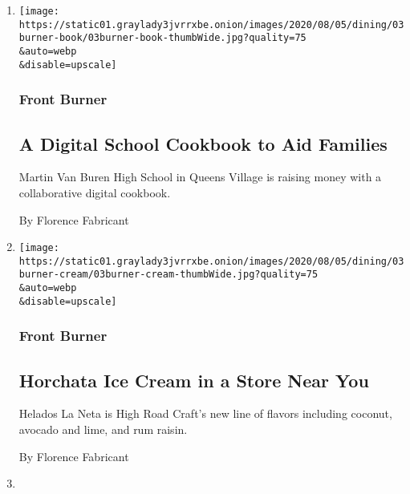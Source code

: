 \begin{enumerate}
\def\labelenumi{\arabic{enumi}.}
\item
  \href{/2020/08/03/dining/martin-van-buren-high-school-cookbook.html}{}

  \texttt{[image: https://static01.graylady3jvrrxbe.onion/images/2020/08/05/dining/03burner-book/03burner-book-thumbWide.jpg?quality=75\\\&auto=webp\\\&disable=upscale]}

  \hypertarget{front-burner-1}{%
  \subsubsection{Front Burner}\label{front-burner-1}}

  \hypertarget{a-digital-school-cookbook-to-aid-families}{%
  \subsection{A Digital School Cookbook to Aid
  Families}\label{a-digital-school-cookbook-to-aid-families}}

  Martin Van Buren High School in Queens Village is raising money with a
  collaborative digital cookbook.

  By Florence Fabricant
\item
  \href{/2020/08/03/dining/mexican-ice-cream.html}{}

  \texttt{[image: https://static01.graylady3jvrrxbe.onion/images/2020/08/05/dining/03burner-cream/03burner-cream-thumbWide.jpg?quality=75\\\&auto=webp\\\&disable=upscale]}

  \hypertarget{front-burner-2}{%
  \subsubsection{Front Burner}\label{front-burner-2}}

  \hypertarget{horchata-ice-cream-in-a-store-near-you}{%
  \subsection{Horchata Ice Cream in a Store Near
  You}\label{horchata-ice-cream-in-a-store-near-you}}

  Helados La Neta is High Road Craft's new line of flavors including
  coconut, avocado and lime, and rum raisin.

  By Florence Fabricant
\item
  \href{/2020/08/03/dining/new-york-biltong.html}{}


\end{enumerate}
